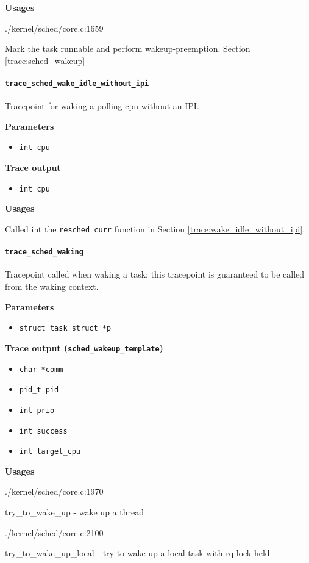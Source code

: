 \textbf{Usages}
\begin{code}
./kernel/sched/core.c:1659
\end{code}
Mark the task runnable and perform wakeup-preemption.
Section \ref{trace:sched_wakeup}
  
\paragraph{\texttt{trace\_sched\_wake\_idle\_without\_ipi}}
Tracepoint for waking a polling cpu without an IPI.

\textbf{Parameters}
\begin{itemize}
    \item \verb|int cpu|
\end{itemize}

\textbf{Trace output}
\begin{itemize}
    \item \verb|int cpu|
\end{itemize}

\textbf{Usages}
\begin{code}

\end{code}

Called int the \verb|resched_curr| function in Section \ref{trace:wake_idle_without_ipi}.

\paragraph{\texttt{trace\_sched\_waking}}
Tracepoint called when waking a task; this tracepoint is guaranteed to be called from the waking context.

\textbf{Parameters}
\begin{itemize}
    \item \verb|struct task_struct *p|
\end{itemize}

\textbf{Trace output (\texttt{sched\_wakeup\_template})}
\begin{itemize}
    \item \verb|char *comm|
    \item \verb|pid_t pid|
    \item \verb|int prio|
    \item \verb|int success|
    \item \verb|int target_cpu|
\end{itemize}

\textbf{Usages}
\begin{code}
./kernel/sched/core.c:1970
\end{code}
try\_to\_wake\_up - wake up a thread
\begin{code}
./kernel/sched/core.c:2100
\end{code}
try\_to\_wake\_up\_local - try to wake up a local task with rq lock held

